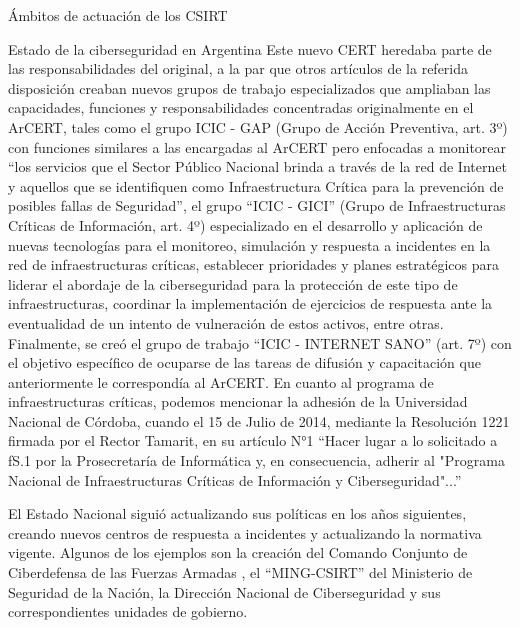 \begin{section}{Ámbitos de actuación de los CSIRT}
\begin{subsection}{Estado de la ciberseguridad en Argentina}
        Este nuevo CERT heredaba parte de las responsabilidades del original, a la par que otros artículos de la referida disposición creaban nuevos grupos de trabajo especializados que ampliaban las capacidades, funciones y responsabilidades concentradas originalmente en el ArCERT, tales como el grupo ICIC - GAP (Grupo de Acción Preventiva, art. 3º) con funciones similares a las encargadas al ArCERT pero enfocadas a monitorear “los servicios que el Sector Público Nacional brinda a través de la red de Internet y aquellos que se identifiquen como Infraestructura Crítica para la prevención de posibles fallas de Seguridad”, el grupo “ICIC - GICI” (Grupo de Infraestructuras Críticas de Información, art. 4º) especializado en el desarrollo y aplicación de nuevas tecnologías para el monitoreo, simulación y respuesta a incidentes en la red de infraestructuras críticas, establecer prioridades y planes estratégicos para liderar el abordaje de la ciberseguridad para la protección de este tipo de infraestructuras, coordinar la implementación de ejercicios de respuesta ante la eventualidad de un intento de vulneración de estos activos, entre otras. Finalmente, se creó el grupo de trabajo “ICIC - INTERNET SANO” (art. 7º) con el objetivo específico de ocuparse de las tareas de difusión y capacitación que anteriormente le correspondía al ArCERT. En cuanto al programa de infraestructuras críticas, podemos mencionar la adhesión de la Universidad Nacional de Córdoba, cuando el 15 de Julio de 2014, mediante la Resolución 1221 \cite{unc_rec} firmada por el Rector Tamarit, en su artículo N°1 “Hacer lugar a lo solicitado a fS.1 por la Prosecretaría de Informática y, en consecuencia, adherir al "Programa Nacional de Infraestructuras Críticas de Información y Ciberseguridad"...” \par
        El Estado Nacional siguió actualizando sus políticas en los años siguientes, creando nuevos centros de respuesta a incidentes y actualizando la normativa vigente. Algunos de los ejemplos son la creación del Comando Conjunto de Ciberdefensa de las Fuerzas Armadas \cite{fa_comando}, el “MING-CSIRT” \cite{minis_seg} del Ministerio de Seguridad de la Nación, la Dirección Nacional de Ciberseguridad \cite{dir_nac_ciber} y sus correspondientes unidades de gobierno. \par
       \begin{figure}[H]
            \centering

\end{figure}
\end{subsection}
\end{section}
